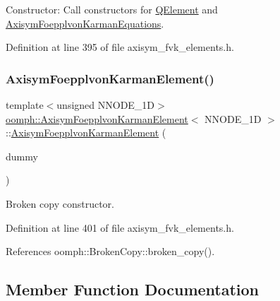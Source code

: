 Constructor\+: Call constructors for \hyperlink{classoomph_1_1QElement}{Q\+Element} and \hyperlink{classoomph_1_1AxisymFoepplvonKarmanEquations}{Axisym\+Foepplvon\+Karman\+Equations}. 



Definition at line 395 of file axisym\+\_\+fvk\+\_\+elements.\+h.

\mbox{\label{classoomph_1_1AxisymFoepplvonKarmanElement_a3258341718feafc5196b85594911fd19}} 
\subsubsection{\texorpdfstring{Axisym\+Foepplvon\+Karman\+Element()}{AxisymFoepplvonKarmanElement()}\hspace{0.1cm}{\footnotesize\ttfamily [4/4]}}
{\footnotesize\ttfamily template$<$unsigned N\+N\+O\+D\+E\+\_\+1D$>$ \\
\hyperlink{classoomph_1_1AxisymFoepplvonKarmanElement}{oomph\+::\+Axisym\+Foepplvon\+Karman\+Element}$<$ N\+N\+O\+D\+E\+\_\+1D $>$\+::\hyperlink{classoomph_1_1AxisymFoepplvonKarmanElement}{Axisym\+Foepplvon\+Karman\+Element} (\begin{DoxyParamCaption}\item[{const \hyperlink{classoomph_1_1AxisymFoepplvonKarmanElement}{Axisym\+Foepplvon\+Karman\+Element}$<$ N\+N\+O\+D\+E\+\_\+1D $>$ \&}]{dummy }\end{DoxyParamCaption})\hspace{0.3cm}{\ttfamily [inline]}}



Broken copy constructor. 



Definition at line 401 of file axisym\+\_\+fvk\+\_\+elements.\+h.



References oomph\+::\+Broken\+Copy\+::broken\+\_\+copy().



\subsection{Member Function Documentation}
\mbox{\label{classoomph_1_1AxisymFoepplvonKarmanElement_a20841d263ec4590d5614d43f2f813ae7}} 
